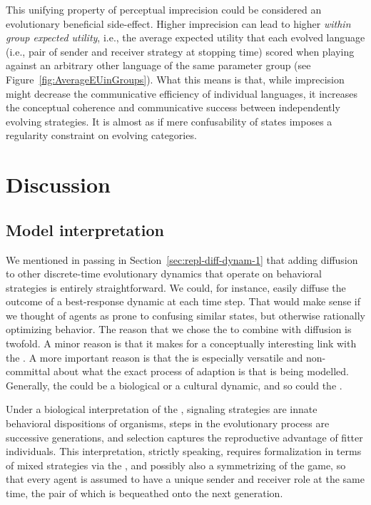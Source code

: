 \documentclass[fleqn,reqno,10pt]{article}
\newcommand{\rd}{\acro{rd}} %
\newcommand{\rmd}{\acro{rmd}} %
\newcommand{\rdd}{\acro{rdd}} %
\begin{document}
This unifying property of perceptual imprecision could be considered
an evolutionary beneficial side-effect. Higher imprecision can lead to
higher \emph{within group expected utility}, i.e., the average
expected utility that each evolved language (i.e., pair of sender and
receiver strategy at stopping time) scored when playing against an
arbitrary other language of the same parameter group (see
Figure~\ref{fig:AverageEUinGroups}). What this means is that, while
imprecision might decrease the communicative efficiency of individual
languages, it increases the conceptual coherence and communicative
success between independently evolving strategies. It is almost as if
mere confusability of states imposes a regularity constraint on
evolving categories.


\section{Discussion}
\label{sec:discussion}

\subsection{Model interpretation}
\label{sec:model-interpretation}

We mentioned in passing in Section~\ref{sec:repl-diff-dynam-1} that
adding diffusion to other discrete-time evolutionary dynamics that
operate on behavioral strategies is entirely straightforward. We
could, for instance, easily diffuse the outcome of a best-response
dynamic at each time step. That would make sense if we thought of
agents as prone to confusing similar states, but otherwise rationally
optimizing behavior. The reason that we chose the \rd to combine with
diffusion is twofold. A minor reason is that it makes for a
conceptually interesting link with the \rmd. A more important reason
is that the \rd is especially versatile and non-committal about what
the exact process of adaption is that is being modelled. Generally,
the \rd could be a biological or a cultural dynamic, and so could the
\rdd.

Under a biological interpretation of the \rd, signaling strategies
are innate behavioral dispositions of organisms, steps in the
evolutionary process are successive generations, and selection
captures the reproductive advantage of fitter individuals. This
interpretation, strictly speaking, requires formalization in terms of
mixed strategies via the \rmd, and possibly also a symmetrizing of the
game, so that every agent is assumed to have a unique sender and
receiver role at the same time, the pair of which is bequeathed onto
the next generation. 
\end{document}
